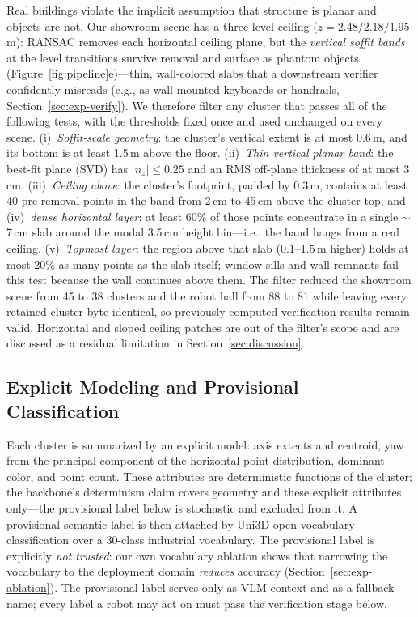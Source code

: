 \documentclass[electronics,article,accept,pdftex,moreauthors]{Definitions/mdpi}
\begin{document}
Real buildings violate the implicit assumption that structure is planar and
objects are not. Our showroom scene has a three-level ceiling
($z=2.48/2.18/1.95$\,m): RANSAC removes each horizontal ceiling plane, but the
\emph{vertical soffit bands} at the level transitions survive removal and
surface as phantom objects (Figure~\ref{fig:pipeline}e)---thin, wall-colored
slabs that a downstream verifier confidently misreads (e.g., as wall-mounted
keyboards or handrails, Section~\ref{sec:exp-verify}). We therefore filter any
cluster that passes all of the following tests, with the thresholds fixed
once and used unchanged on every scene. (i)~\emph{Soffit-scale geometry}: the
cluster's vertical extent is at most 0.6\,m, and its bottom is at least
1.5\,m above the floor. (ii)~\emph{Thin vertical planar band}: the best-fit
plane (SVD) has $|n_z|\le0.25$ and an RMS off-plane thickness of at most
3\,cm. (iii)~\emph{Ceiling above}: the cluster's footprint, padded by
0.3\,m, contains at least 40 pre-removal points in the band from 2\,cm to
45\,cm above the cluster top, and (iv)~\emph{dense horizontal layer}: at
least 60\% of those points concentrate in a single $\sim$7\,cm slab around
the modal 3.5\,cm height bin---i.e., the band hangs from a real ceiling.
(v)~\emph{Topmost layer}: the region above that slab (0.1--1.5\,m higher)
holds at most 20\% as many points as the slab itself; window sills and wall
remnants fail this test because the wall continues above them. The filter reduced the
showroom scene from 45 to 38 clusters and the robot hall from 88 to 81 while
leaving every retained cluster byte-identical, so previously computed
verification results remain valid. Horizontal and sloped ceiling patches are
out of the filter's scope and are discussed as a residual limitation in
Section~\ref{sec:discussion}.



\subsection{Explicit Modeling and Provisional Classification}
\label{sec:explicit}

Each cluster is summarized by an explicit model: axis extents and centroid,
yaw from the principal component of the horizontal point distribution,
dominant color, and point count. These attributes are deterministic functions
of the cluster; the backbone's determinism claim covers geometry and these
explicit attributes only---the provisional label below is stochastic and
excluded from it. A provisional semantic label is then attached by Uni3D
open-vocabulary classification over a 30-class industrial vocabulary. The
provisional label is explicitly \emph{not trusted}: our own vocabulary
ablation shows that narrowing the vocabulary to the deployment
domain \emph{reduces} accuracy (Section~\ref{sec:exp-ablation}). The
provisional label serves only as VLM context and as a fallback name; every
label a robot may act on must pass the verification stage below.
\end{document}
